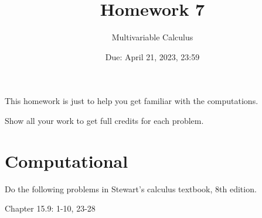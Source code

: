 \documentclass[12pt]{article}
\title{Homework 7}
\author{ Multivariable Calculus}
\date{Due: April 21, 2023, 23:59}
\theoremstyle{definition}
\begin{document}
\maketitle

This homework is just to help you get familiar with the computations. 


Show all your work to get full credits for each problem.
\section{Computational}
Do the following problems in Stewart's calculus textbook, 8th edition.

Chapter 15.9: 1-10, 23-28





%
\end{document}

